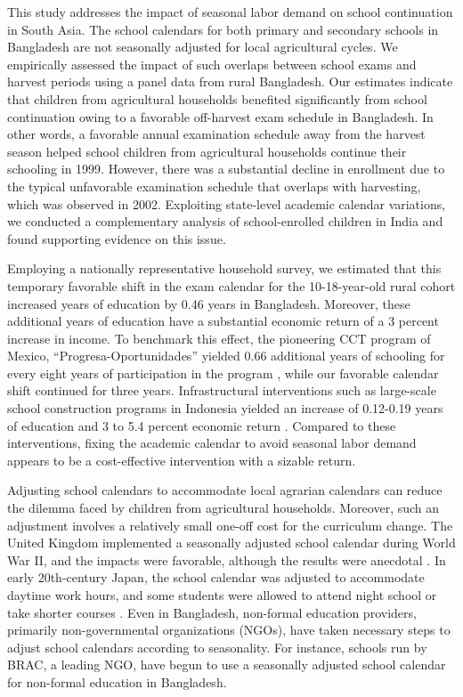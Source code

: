 \documentclass[12pt,letterpaper]{article}\usepackage[margin=1in]{geometry}
\newcommand{\0}{\ensuremath{\mbox{\boldmath $0$}}}
\begin{document}
This study addresses the impact of seasonal labor demand on school continuation in South Asia. The school calendars for both primary and secondary schools in Bangladesh are not seasonally adjusted for local agricultural cycles. We empirically assessed the impact of such overlaps between school exams and harvest periods using a panel data from rural Bangladesh. Our estimates indicate that children from agricultural households benefited significantly from school continuation owing to a favorable off-harvest exam schedule in Bangladesh. In other words, a favorable annual examination schedule away from the harvest season helped school children from agricultural households continue their schooling in 1999. However, there was a substantial decline in enrollment due to the typical unfavorable examination schedule that overlaps with harvesting, which was observed in 2002. Exploiting state-level academic calendar variations, we conducted a complementary analysis of school-enrolled children in India and found supporting evidence on this issue.

Employing a nationally representative household survey, we estimated that this temporary favorable shift in the exam calendar for the 10-18-year-old rural cohort increased years of education by 0.46 years in Bangladesh. Moreover, these additional years of education have a substantial economic return of a 3 percent increase in income. To benchmark this effect, the pioneering CCT program of Mexico, ``Progresa-Oportunidades'' yielded 0.66 additional years of schooling for every eight years of participation in the program \citep{reimers2006education}, while our favorable calendar shift continued for three years. Infrastructural interventions such as large-scale school construction programs in Indonesia yielded an increase of 0.12-0.19 years of education and 3 to 5.4 percent economic return \citep{duflo2001schooling}. Compared to these interventions, fixing the academic calendar to avoid seasonal labor demand appears to be a cost-effective intervention with a sizable return.

Adjusting school calendars to accommodate local agrarian calendars can reduce the dilemma faced by children from agricultural households. Moreover, such an adjustment involves a relatively small one-off cost for the curriculum change. The United Kingdom implemented a seasonally adjusted school calendar during World War II, and the impacts were favorable, although the results were anecdotal \citep[][190-191]{Moore2004}. In early 20th-century Japan, the school calendar was adjusted to accommodate daytime work hours, and some students were allowed to attend night school or take shorter courses \citep[][Chapter 3]{JICA2004}. Even in Bangladesh, non-formal education providers, primarily non-governmental organizations (NGOs), have taken necessary steps to adjust school calendars according to seasonality. For instance, schools run by BRAC, a leading NGO, have begun to use a seasonally adjusted school calendar for non-formal education in Bangladesh.
\end{document}
